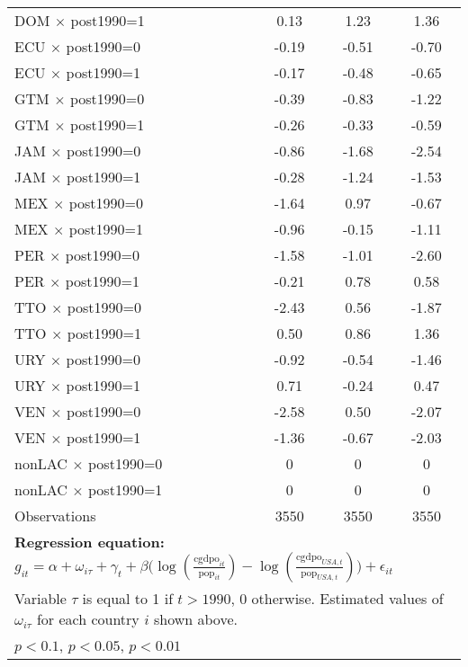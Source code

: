 \begin{table}[htbp]
\begin{tabular}{l*{3}{c}}
DOM $\times$ post1990=1&     0.13         &     1.23\sym{***}&     1.36\sym{***}\\
ECU $\times$ post1990=0&    -0.19         &    -0.51\sym{**} &    -0.70\sym{**} \\
ECU $\times$ post1990=1&    -0.17         &    -0.48\sym{**} &    -0.65\sym{***}\\
GTM $\times$ post1990=0&    -0.39\sym{*}  &    -0.83\sym{***}&    -1.22\sym{***}\\
GTM $\times$ post1990=1&    -0.26\sym{*}  &    -0.33         &    -0.59\sym{**} \\
JAM $\times$ post1990=0&    -0.86\sym{***}&    -1.68\sym{***}&    -2.54\sym{***}\\
JAM $\times$ post1990=1&    -0.28\sym{*}  &    -1.24\sym{***}&    -1.53\sym{***}\\
MEX $\times$ post1990=0&    -1.64\sym{***}&     0.97\sym{***}&    -0.67\sym{**} \\
MEX $\times$ post1990=1&    -0.96\sym{***}&    -0.15         &    -1.11\sym{***}\\
PER $\times$ post1990=0&    -1.58\sym{***}&    -1.01\sym{***}&    -2.60\sym{***}\\
PER $\times$ post1990=1&    -0.21         &     0.78\sym{***}&     0.58\sym{**} \\
TTO $\times$ post1990=0&    -2.43\sym{***}&     0.56\sym{***}&    -1.87\sym{***}\\
TTO $\times$ post1990=1&     0.50\sym{***}&     0.86\sym{***}&     1.36\sym{***}\\
URY $\times$ post1990=0&    -0.92\sym{***}&    -0.54\sym{***}&    -1.46\sym{***}\\
URY $\times$ post1990=1&     0.71\sym{***}&    -0.24         &     0.47\sym{**} \\
VEN $\times$ post1990=0&    -2.58\sym{***}&     0.50\sym{**} &    -2.07\sym{***}\\
VEN $\times$ post1990=1&    -1.36\sym{***}&    -0.67\sym{***}&    -2.03\sym{***}\\
nonLAC $\times$ post1990=0&        0         &        0         &        0         \\
nonLAC $\times$ post1990=1&        0         &        0         &        0         \\
\midrule
Observations    &     3550         &     3550         &     3550         \\
\bottomrule
\multicolumn{4}{l}{\footnotesize \textbf{Regression equation:} \(g_{it} = \alpha + \omega_{i\tau} + \gamma_t + \beta \big(\log (\frac{\textrm{cgdpo}_{it}}{\textrm{pop}_{it}} ) - \log (\frac{\textrm{cgdpo}_{USA,t}}{\textrm{pop}_{USA,t}}  ) \big) + \epsilon_{it}\)}\\
\multicolumn{4}{l}{\footnotesize Variable \(\tau\) is equal to 1 if \(t > 1990\), 0 otherwise. Estimated values of \(\omega_{i\tau}\) for each country \(i\) shown above.}\\
\multicolumn{4}{l}{\footnotesize \sym{*} \(p<0.1\), \sym{**} \(p<0.05\), \sym{***} \(p<0.01\)}\\
\end{tabular}
\end{table}
